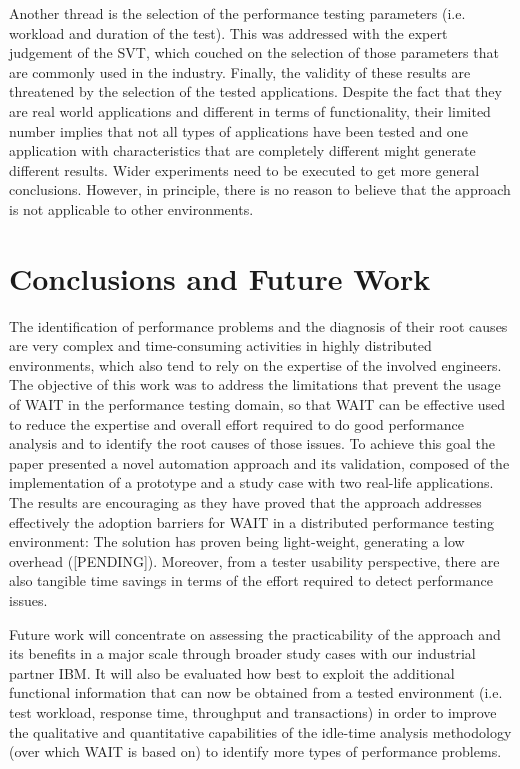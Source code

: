 \documentclass[runningheads,a4paper]{llncs}
\begin{document}
Another thread is the selection of the performance testing parameters (i.e.
workload and duration of the test). This was addressed with the expert judgement 
of the SVT, which couched on the selection of those parameters that are
commonly used in the industry. Finally, the validity of these results are
threatened by the selection of the tested applications. Despite the fact that
they are real world applications and different in terms of functionality, their
limited number implies that not all types of applications have been tested and
one application with characteristics that are completely different might
generate different results. Wider experiments need to be executed to get more
general conclusions. However, in principle, there is no reason to believe that
the approach is not applicable to other environments.



\section{Conclusions and Future Work}

The identification of performance problems and the diagnosis of their root
causes are very complex and time-consuming activities in highly distributed
environments, which also tend to rely on the expertise of the involved
engineers. The objective of this work was to address the limitations that
prevent the usage of WAIT in the performance testing domain, so that WAIT can be
effective used to reduce the expertise and overall effort required to do
good performance analysis and to identify the root causes of those issues.
To achieve this goal the paper presented a novel automation approach and its
validation, composed of the implementation of a prototype and a study
case with two real-life applications. The results are encouraging as they have
proved that the approach addresses effectively the adoption barriers for WAIT in 
a distributed performance testing environment: The solution has proven being
light-weight, generating a low overhead ([PENDING]). Moreover, from a tester
usability perspective, there are also tangible time savings in terms of the
effort required to detect performance issues.

Future work will concentrate on assessing the practicability of the
approach and its benefits in a major scale through broader study cases with our
industrial partner IBM. It will also be evaluated how best to exploit the
additional functional information that can now be obtained from a tested environment
(i.e. test workload, response time, throughput and transactions) in order to
improve the qualitative and quantitative capabilities of the idle-time
analysis methodology (over which WAIT is based on) to identify more
types of performance problems.
\end{document}
